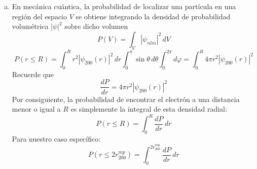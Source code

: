 \documentclass[a4paper]{article}
\begin{document}
\begin{enumerate}[a)]
$$ f'(r) = r\left(2-\frac{r}{a_0}\right)e^{-r/a_0} \left[ 2\left(2-\frac{r}{a_0}\right) - \frac{2r}{a_0} - \frac{r}{a_0}\left(2-\frac{r}{a_0}\right) \right] $$
Simplificación de la expresión en paréntesis
$$ 4 - \frac{2r}{a_0} - \frac{2r}{a_0} - \frac{2r}{a_0} + \frac{r^2}{a_0^2} = 4 - \frac{6r}{a_0} + \frac{r^2}{a_0^2} $$
La ecuación a resolver es entonces:
$$ r\left(2-\frac{r}{a_0}\right)e^{-r/a_0} \left( \frac{r^2}{a_0^2} - \frac{6r}{a_0} + 4 \right) = 0 $$
Esto nos da tres tipos de soluciones:
\begin{itemize}
    \item $r = 0$: corresponde a un mínimo (la probabilidad radial se anula en el origen).
    \item $r = 2a_0$: es el nodo radial de la función de onda $\psi_{200}$, donde la probabilidad también se anula (mínimo local).
    \item $\frac{r^2}{a_0^2} - \frac{6r}{a_0} + 4 = 0$: esta ecuación cuadrática nos da los máximos locales.
\end{itemize}

Resolvemos la ecuación cuadrática haciendo el cambio $x = r/a_0$:
$$ x^2 - 6x + 4 = 0 \implies x = \frac{6 \pm \sqrt{36 - 16}}{2} = \frac{6 \pm \sqrt{20}}{2} = 3 \pm \sqrt{5} $$
Obtenemos dos máximos locales:
$$ r_1 = (3 - \sqrt{5})a_0   \qquad \text{y} \qquad r_2 = (3 + \sqrt{5})a_0 $$
Para determinar cuál es el máximo global, evaluamos $\frac{dP}{dr}$ en ambos puntos. Dado que el factor exponencial $e^{-r/a_0}$ decae rápidamente, comparamos las magnitudes:
$$ \left.\frac{dP}{dr}\right|_{r_1} \propto (3-\sqrt{5})^2(\sqrt{5}-1)^2 e^{-(3-\sqrt{5})} \approx 0.415 $$
$$ \left.\frac{dP}{dr}\right|_{r_2} \propto (3+\sqrt{5})^2(1+\sqrt{5})^2 e^{-(3+\sqrt{5})} \approx 1.530 $$
Dado que $\left.\frac{dP}{dr}\right|_{r_2} > \left.\frac{dP}{dr}\right|_{r_1}$, el máximo global de la densidad de probabilidad radial se encuentra en $r_2$. Denotamos este radio más probable como:
$$ r_{200}^{mp} \equiv \text{Radio más probable en el estado } \psi_{200} $$
Por lo tanto, la distancia radial más probable para encontrar el electrón en el estado $\psi_{200}$ es:
$$ r_{200}^{mp} = (3 + \sqrt{5})\, a_0 \approx 5.236\, a_0 $$

	\item En mecánica cuántica, la probabilidad de localizar una partícula en una región del espacio $V$ se obtiene integrando la densidad de probabilidad volumétrica $|\psi|^2$ sobre dicho volumen
$$ P(V) = \int_V |\psi_{nlm}|^2 \, dV $$
$$ P(r \leq R) = \int_0^R r^2 |\psi_{200}(r)|^2 \, dr \int_0^\pi \sin\theta \, d\theta \int_0^{2\pi} d\varphi =\int_0^R 4\pi r^2 |\psi_{200}(r)|^2$$
Recuerde que
$$ \frac{dP}{dr} = 4\pi r^2 |\psi_{200}(r)|^2 $$
Por consiguiente, la probabilidad de encontrar el electrón a una distancia menor o igual a $R$ es simplemente la integral de esta densidad radial:
$$ P(r \leq R) = \int_0^R \frac{dP}{dr} \, dr $$
Para nuestro caso específico:
$$ P(r \leq 2r_{200}^{mp}) = \int_{0}^{2r_{200}^{mp}} \frac{dP}{dr} \, dr $$



\end{enumerate}
\end{document}
